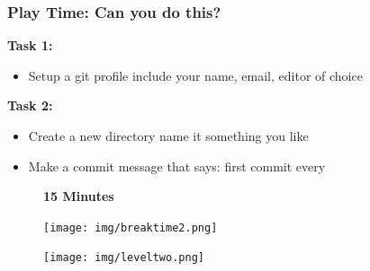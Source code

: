 \documentclass{beamer}
\begin{document}
\begin{frame}
	\frametitle{\textbf{Play Time: Can you do this?}}
	\textbf{Task 1:}
	\begin{itemize}
	\item Setup a git profile include your name, email, editor of choice 
	\end{itemize}
	
	\vspace{1cm}

	\textbf{Task 2:}
	\begin{itemize}
	\item Create a new directory name it something you like
	\item Make a commit message that says: first commit every
	\end{itemize}

	\vspace{1cm}

	\begin{figure}[h]
	\centering
	\textbf{15 Minutes}
	\end{figure}

\end{frame}

\begin{frame}
	\begin{figure}[h]
	\centering
	\texttt{[image: img/breaktime2.png]} 
	\end{figure}
\end{frame}

\begin{frame}
	\begin{figure}[h]
	\centering
	\texttt{[image: img/leveltwo.png]} 
	\end{figure}
\end{frame}
\end{document}
